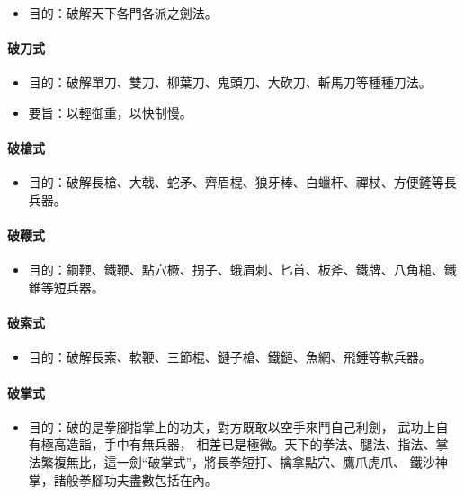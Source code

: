 \begin{itemize}
\item 目的：破解天下各門各派之劍法。
\end{itemize}

\paragraph{破刀式}

\begin{itemize}
\item 目的：破解單刀、雙刀、柳葉刀、鬼頭刀、大砍刀、斬馬刀等種種刀法。
\item 要旨：以輕御重，以快制慢。
\end{itemize}

\paragraph{破槍式}

\begin{itemize}
\item 目的：破解長槍、大戟、蛇矛、齊眉棍、狼牙棒、白蠟杆、禪杖、方便鏟等長兵器。
\end{itemize}

\paragraph{破鞭式}

\begin{itemize}
\item 目的：鋼鞭、鐵鞭、點穴橛、拐子、蛾眉刺、匕首、板斧、鐵牌、八角槌、鐵錐等短兵器。
\end{itemize}

\paragraph{破索式}

\begin{itemize}
\item 目的：破解長索、軟鞭、三節棍、鏈子槍、鐵鏈、魚網、飛錘等軟兵器。
\end{itemize}

\paragraph{破掌式}

\begin{itemize}
\item 目的：破的是拳腳指掌上的功夫，對方既敢以空手來鬥自己利劍， 武功上自有極高造詣，手中有無兵器，
  相差已是極微。天下的拳法、腿法、指法、掌法繁複無比，這一劍“破掌式”，將長拳短打、擒拿點穴、鷹爪虎爪、
  鐵沙神掌，諸般拳腳功夫盡數包括在內。 
\end{itemize}

